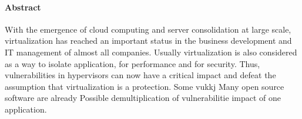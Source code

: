 \paragraph{Abstract}
With the emergence of cloud computing and server consolidation at large scale,
virtualization has reached an important status in the business development and IT management
of almost all companies.
Usually virtualization is also considered as a way to isolate application, for
performance and for security.
Thus, vulnerabilities in hypervisors can now have a critical impact and defeat
the assumption that virtualization is a protection.
Some vukkj
Many open source software are already 
Possible demultiplication of vulnerabilitie impact of one application.
